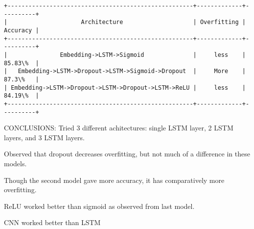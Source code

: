 \documentclass[11pt]{article}
\begin{document}
    \begin{Verbatim}[commandchars=\\\{\}]
+-----------------------------------------------------+-------------+----------+
|                     Architecture                    | Overfitting | Accuracy |
+-----------------------------------------------------+-------------+----------+
|               Embedding->LSTM->Sigmoid              |     less    |  85.83\%  |
|   Embedding->LSTM->Dropout->LSTM->Sigmoid->Dropout  |     More    |  87.3\%   |
| Embedding->LSTM->Dropout->LSTM->Dropout->LSTM->ReLU |     less    |  84.19\%  |
+-----------------------------------------------------+-------------+----------+

    \end{Verbatim}

    CONCLUSIONS: Tried 3 different achitectures: single LSTM layer, 2 LSTM
layers, and 3 LSTM layers.

Observed that dropout decreases overfitting, but not much of a
difference in these models.

Though the second model gave more accuracy, it has comparatively more
overfitting.

ReLU worked better than sigmoid as observed from last model.

CNN worked better than LSTM


    
    
    
    
\end{document}
